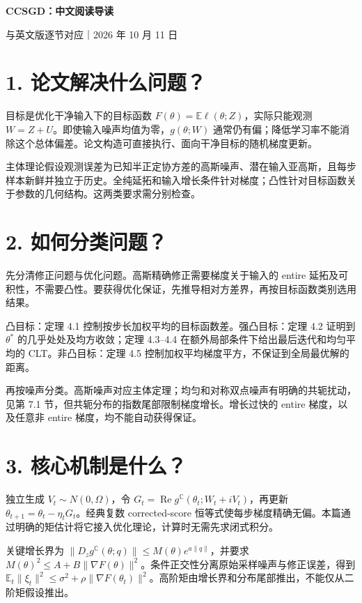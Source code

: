 \documentclass[11pt]{article}
\begin{document}
{\LARGE\bfseries CCSGD：中文阅读导读}\par{\small 与英文版逐节对应｜2026 年 10 月 11 日}\par

\section*{1. 论文解决什么问题？}
目标是优化干净输入下的目标函数 $F(\theta)=\mathbb E\ell(\theta;Z)$，实际只能观测 $W=Z+U$。即使输入噪声均值为零，$g(\theta;W)$ 通常仍有偏；降低学习率不能消除这个总体偏差。论文构造可直接执行、面向干净目标的随机梯度更新。

主体理论假设观测误差为已知半正定协方差的高斯噪声、潜在输入亚高斯，且每步样本新鲜并独立于历史。全纯延拓和输入增长条件针对梯度；凸性针对目标函数关于参数的几何结构。这两类要求需分别检查。


\section*{2. 如何分类问题？}
先分清修正问题与优化问题。高斯精确修正需要梯度关于输入的 entire 延拓及可积性，不需要凸性。要获得优化保证，先推导相对方差界，再按目标函数类别选用结果。

凸目标：定理 4.1 控制按步长加权平均的目标函数差。强凸目标：定理 4.2 证明到 $\theta^*$ 的几乎处处及均方收敛；定理 4.3--4.4 在额外局部条件下给出最后迭代和均匀平均的 CLT。非凸目标：定理 4.5 控制加权平均梯度平方，不保证到全局最优解的距离。

再按噪声分类。高斯噪声对应主体定理；均匀和对称双点噪声有明确的共轭扰动，见第 7.1 节，但共轭分布的指数尾部限制梯度增长。增长过快的 entire 梯度，以及任意非 entire 梯度，均不能自动获得保证。


\section*{3. 核心机制是什么？}
独立生成 $V_t\sim N(0,\Omega)$，令 $G_t=\operatorname{Re}g^{\mathbb C}(\theta_t;W_t+iV_t)$，再更新 $\theta_{t+1}=\theta_t-\eta_tG_t$。经典复数 corrected-score 恒等式使每步梯度精确无偏。本篇通过明确的矩估计将它接入优化理论，计算时无需先求闭式积分。

关键增长界为 $\|D_zg^{\mathbb C}(\theta;q)\|\le M(\theta)e^{a\|q\|}$，并要求 $M(\theta)^2\le A+B\|\nabla F(\theta)\|^2$。条件正交性分离原始采样噪声与修正误差，得到 $\mathbb E_t\|\xi_t\|^2\le\sigma^2+\rho\|\nabla F(\theta_t)\|^2$。高阶矩由增长界和分布尾部推出，不能仅从二阶矩假设推出。


\clearpage
\end{document}
